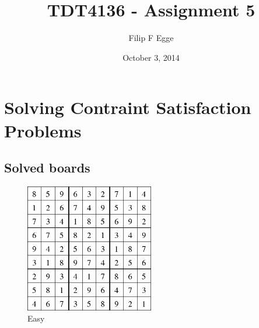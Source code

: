\documentclass{article}
\begin{document}
\title{TDT4136 - Assignment 5}
\author{Filip F Egge}
\date{October 3, 2014}
\maketitle

\newpage
\section*{Solving Contraint Satisfaction Problems}
\subsection*{Solved boards}
	\FloatBarrier
	\begin{figure}[!htb]
		\caption{Easy}
		\centering
		\includegraphics[width=0.5\textwidth]{easy.png}
	\end{figure}
\end{document}
